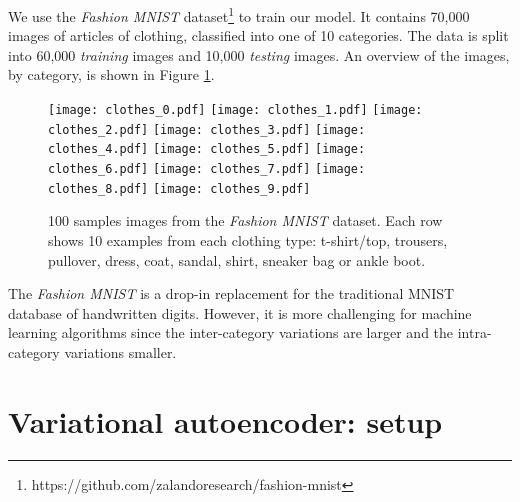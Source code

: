\documentclass[]{article}
\begin{document}
We use the \textit{Fashion MNIST} dataset\footnote{https://github.com/zalandoresearch/fashion-mnist} to train our model. It contains 70,000 images of articles of clothing, classified into one of 10 categories. The data is split into 60,000 \textit{training} images and 10,000 \textit{testing} images. An overview of the images, by category, is shown in Figure \ref{fig:mnist_fashion}.

\begin{figure}
  \centering
  \texttt{[image: clothes\_0.pdf]}
  \texttt{[image: clothes\_1.pdf]}
  \texttt{[image: clothes\_2.pdf]}
  \texttt{[image: clothes\_3.pdf]}
  \texttt{[image: clothes\_4.pdf]}
  \texttt{[image: clothes\_5.pdf]}
  \texttt{[image: clothes\_6.pdf]}
  \texttt{[image: clothes\_7.pdf]}
  \texttt{[image: clothes\_8.pdf]}
  \texttt{[image: clothes\_9.pdf]}
  \caption{100 samples images from the \textit{Fashion MNIST} dataset. Each row shows 10 examples from each clothing type: t-shirt/top, trousers, pullover, dress, coat, sandal, shirt, sneaker bag or ankle boot.}
  \label{fig:mnist_fashion}
\end{figure}

The \textit{Fashion MNIST} is a drop-in replacement for the traditional MNIST database of handwritten digits. However, it is more challenging for machine learning algorithms since the inter-category variations are larger and the intra-category variations smaller. 




\section{Variational autoencoder: setup}
\label{sec:vae}
\end{document}
